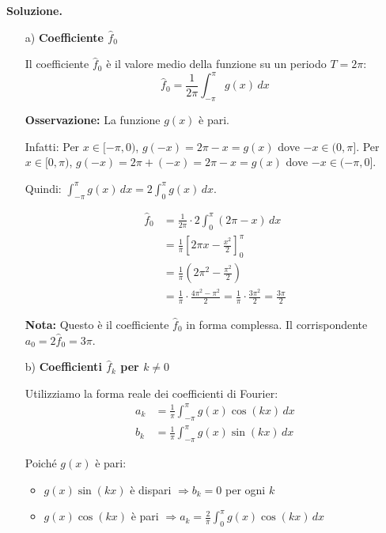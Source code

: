 \documentclass[12pt, a4paper]{article}
\newenvironment{solution}{%
    \par\noindent\textbf{Soluzione.}\medskip\par
    \normalfont
}{\par\bigskip}
\begin{document}
\begin{solution}
\begin{enumerate}
    \item[a)] \textbf{Coefficiente $\hat{f}_0$}
    
    Il coefficiente $\hat{f}_0$ è il valore medio della funzione su un periodo $T = 2\pi$:
    \[\hat{f}_0 = \frac{1}{2\pi} \int_{-\pi}^{\pi} g(x) \, dx\]
    
    \textbf{Osservazione:} La funzione $g(x)$ è pari.
    
    Infatti: Per $x \in [-\pi, 0)$, $g(-x) = 2\pi - x = g(x)$ dove $-x \in (0, \pi]$.
    Per $x \in [0, \pi)$, $g(-x) = 2\pi + (-x) = 2\pi - x = g(x)$ dove $-x \in (-\pi, 0]$.
    
    Quindi: $\int_{-\pi}^{\pi} g(x) \, dx = 2 \int_{0}^{\pi} g(x) \, dx$.
    
    \begin{align}
        \hat{f}_0 &= \frac{1}{2\pi} \cdot 2 \int_{0}^{\pi} (2\pi-x) \, dx \\
        &= \frac{1}{\pi} \left[ 2\pi x - \frac{x^2}{2} \right]_0^{\pi} \\
        &= \frac{1}{\pi} \left( 2\pi^2 - \frac{\pi^2}{2} \right) \\
        &= \frac{1}{\pi} \cdot \frac{4\pi^2 - \pi^2}{2} = \frac{1}{\pi} \cdot \frac{3\pi^2}{2} = \frac{3\pi}{2}
    \end{align}
    
    \textbf{Nota:} Questo è il coefficiente $\hat{f}_0$ in forma complessa. Il corrispondente $a_0 = 2\hat{f}_0 = 3\pi$.

    \item[b)] \textbf{Coefficienti $\hat{f}_k$ per $k \neq 0$}
    
    Utilizziamo la forma reale dei coefficienti di Fourier:
    \begin{align}
        a_k &= \frac{1}{\pi} \int_{-\pi}^{\pi} g(x) \cos(kx) \, dx \\
        b_k &= \frac{1}{\pi} \int_{-\pi}^{\pi} g(x) \sin(kx) \, dx
    \end{align}
    
    Poiché $g(x)$ è pari:
    \begin{itemize}
        \item $g(x)\sin(kx)$ è dispari $\Rightarrow b_k = 0$ per ogni $k$
        \item $g(x)\cos(kx)$ è pari $\Rightarrow a_k = \frac{2}{\pi} \int_{0}^{\pi} g(x) \cos(kx) \, dx$
    \end{itemize}
    

\end{enumerate}
\end{solution}
\end{document}
